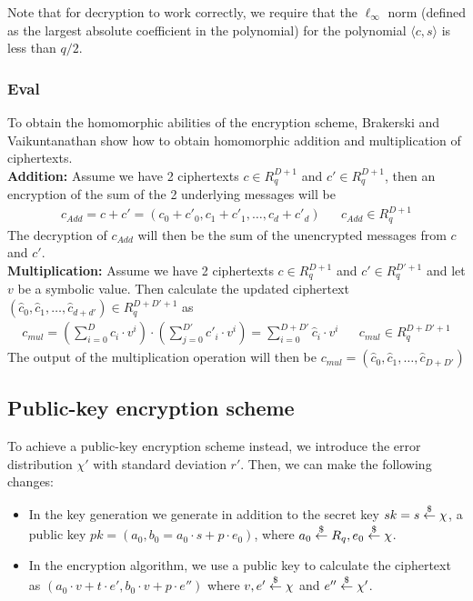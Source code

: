 \documentclass[../main.tex]{subfiles}
\begin{document}
Note that for decryption to work correctly, we require that the $\ell_\infty$ norm (defined as the largest absolute coefficient in the polynomial) for the polynomial $\langle c, s \rangle$ is less than $q / 2$.

\subsubsection{Eval}
To obtain the homomorphic abilities of the encryption scheme, Brakerski and Vaikuntanathan show
how to obtain homomorphic addition and multiplication of ciphertexts.
\\[2mm]
\textbf{Addition:} Assume we have 2 ciphertexts $c \in R_q^{D+1}$ and $c' \in R_q^{D+1}$, then an encryption
of the sum of the 2 underlying messages will be
\begin{align*}
    c_{Add} = c + c' = (c_0 + c'_0, c_1 + c'_1, \dots , c_d + c'_d) &  & c_{Add} \in R_q^{D + 1}
\end{align*}
The decryption of $c_{Add}$ will then be the sum of the unencrypted messages from $c$ and $c'$.
\\[2mm]
\textbf{Multiplication:} Assume we have 2 ciphertexts $c \in R_q^{D+1}$ and $c' \in R_q^{D'+1}$ and let $v$ be a symbolic value.
Then calculate the updated ciphertext $(\hat{c}_0, \hat{c}_1, \dots, \hat{c}_{d+d'}) \in R_q^{D + D' + 1}$ as
\begin{align*}
    c_{mul} = (\sum_{i=0}^D c_i \cdot v^i) \cdot
    (\sum_{j=0}^{D'} c'_i \cdot v^i) =
    \sum_{i=0}^{D+D'} \hat{c}_i \cdot v^i
     &  & c_{mul} \in R_q^{D+D'+1}
\end{align*}
The output of the multiplication operation will then be $c_{mul} = (\hat{c}_0, \hat{c}_1, \dots, \hat{c}_{D+D'})$

\subsection{Public-key encryption scheme}
To achieve a public-key encryption scheme instead, we introduce the error distribution $\chi '$ with standard deviation $r'$.
Then, we can make the following changes:
\begin{itemize}
    \item In the key generation we generate in addition to the secret key $sk = s \overset{\$}{\gets}{} \chi$, a public key
        $pk = (a_0 , b_0 = a_0 \cdot s + p \cdot e_0)$, where $a_0 \overset{\$}{\gets}{} R_q, e_0 \overset{\$}{\gets}{} \chi$.
    \item In the encryption algorithm, we use a public key to calculate the ciphertext as
        $(a_0 \cdot v + t \cdot e', b_0 \cdot v + p \cdot e'')$ where
        $v, e' \overset{\$}{\gets}{} \chi$ and $e'' \overset{\$}{\gets}{} \chi '$.
\end{itemize}
\end{document}
